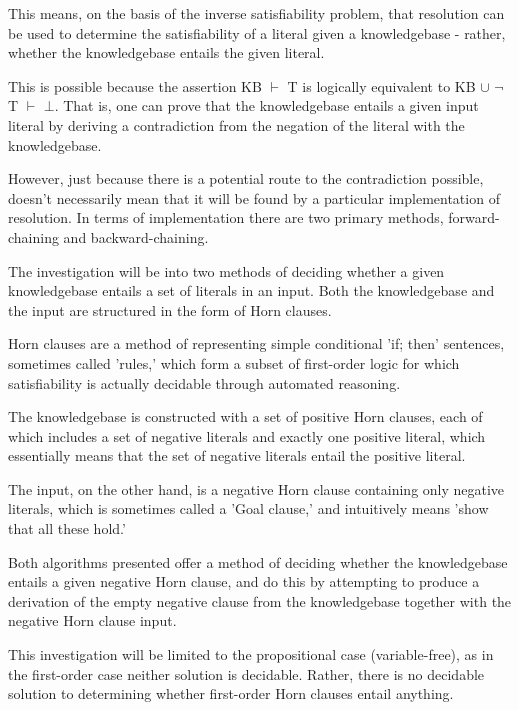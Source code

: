 \documentclass{article}
\begin{document}
This means, on the basis of the inverse satisfiability problem\cite{invsat},
that resolution can be used to determine the satisfiability of a
literal given a knowledgebase - rather, whether the knowledgebase entails the
given literal.

This is possible because the assertion KB $\vdash$ T is logically equivalent to
KB $\cup$ $\neg$T $\vdash$ $\bot$. That is, one can prove that the knowledgebase
entails a given input literal by deriving a contradiction from the negation of
the literal with the knowledgebase.

However, just because there is a potential route to the contradiction possible,
doesn't necessarily mean that it will be found by a particular implementation of
resolution. In terms of implementation there are two primary methods, 
forward-chaining and backward-chaining.





The investigation will be into two methods of deciding whether a given
knowledgebase entails a set of literals in an input. Both the knowledgebase and
the input are structured in the form of Horn clauses.

Horn clauses are a method of representing simple conditional 'if; then'
sentences, sometimes called 'rules,' which form a subset of first-order logic 
for which satisfiability is actually decidable through automated reasoning.

The knowledgebase is constructed with a set of positive Horn clauses, each of
which includes a set of negative literals and exactly one positive literal,
which essentially means that the set of negative literals entail the positive
literal.

The input, on the other hand, is a negative Horn clause containing only negative
literals, which is sometimes called a 'Goal clause,' and intuitively means 
'show that all these hold.'

Both algorithms presented offer a method of deciding whether the knowledgebase
entails a given negative Horn clause, and do this by 
attempting to produce a derivation of the empty negative clause from the
knowledgebase together with the negative Horn clause input.

This investigation will be limited to the propositional case (variable-free), 
as in the first-order case neither solution is decidable. Rather, there is no 
decidable solution to determining whether first-order Horn clauses entail
anything.
\end{document}
